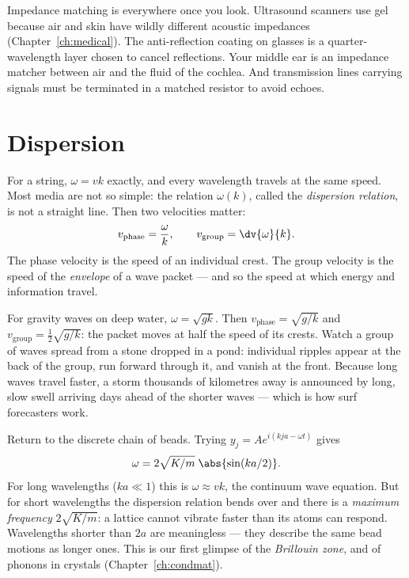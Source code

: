 Impedance matching is everywhere once you look. Ultrasound scanners use gel because air and skin have wildly different acoustic impedances (Chapter~\ref{ch:medical}). The anti-reflection coating on glasses is a quarter-wavelength layer chosen to cancel reflections. Your middle ear is an impedance matcher between air and the fluid of the cochlea. And transmission lines carrying signals must be terminated in a matched resistor to avoid echoes.

\section{Dispersion}
\label{sec:dispersion}

For a string, $\omega = vk$ exactly, and every wavelength travels at the same speed. Most media are not so simple: the relation $\omega(k)$, called the \emph{dispersion relation}, is not a straight line. Then two velocities matter:
\[
  v_{\text{phase}} = \frac{\omega}{k}, \qquad v_{\text{group}} = \dv{\omega}{k} .
\]
The phase velocity is the speed of an individual crest. The group velocity is the speed of the \emph{envelope} of a wave packet --- and so the speed at which energy and information travel.

\begin{example}
For gravity waves on deep water, $\omega = \sqrt{gk}$. Then $v_{\text{phase}} = \sqrt{g/k}$ and $v_{\text{group}} = \tfrac12\sqrt{g/k}$: the packet moves at half the speed of its crests. Watch a group of waves spread from a stone dropped in a pond: individual ripples appear at the back of the group, run forward through it, and vanish at the front. Because long waves travel faster, a storm thousands of kilometres away is announced by long, slow swell arriving days ahead of the shorter waves --- which is how surf forecasters work.
\end{example}

\begin{example}
Return to the discrete chain of beads. Trying $y_j = Ae^{i(kja - \omega t)}$ gives
\[
  \omega = 2\sqrt{K/m}\;\abs{\sin(ka/2)} .
\]
For long wavelengths ($ka\ll1$) this is $\omega\approx v k$, the continuum wave equation. But for short wavelengths the dispersion relation bends over and there is a \emph{maximum frequency} $2\sqrt{K/m}$: a lattice cannot vibrate faster than its atoms can respond. Wavelengths shorter than $2a$ are meaningless --- they describe the same bead motions as longer ones. This is our first glimpse of the \emph{Brillouin zone}, and of phonons in crystals (Chapter~\ref{ch:condmat}).
\end{example}

